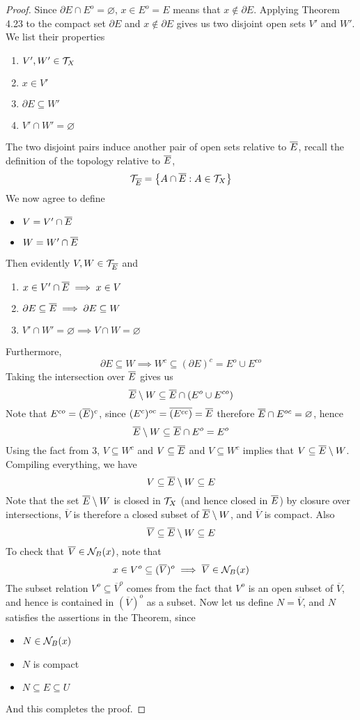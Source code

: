 \documentclass[../../main.tex]{subfiles}
\begin{document}
\begin{proof}
    Since $\partial E\cap E^o = \varnothing$, $x\in E^o=E$ means that $x\notin \partial E$. Applying Theorem 4.23 to the compact set $\partial E$ and $x\notin \partial E$ gives us two disjoint open sets $V'$ and $W'$. We list their properties
    \begin{enumerate}
        \item $V', W'\in\mathcal{T}_X$
        \item $x\in V'$
        \item $\partial E\subseteq W'$
        \item $V'\cap W' = \varnothing$
    \end{enumerate}
    The two disjoint pairs induce another pair of open sets relative to $\overline{E}$, recall the definition of the topology relative to $\overline{E}$,
    \[
    \mathcal{T}_{\overline{E}} = \left\{A\cap\overline{E}:A\in\mathcal{T}_X\right\}
    \]
    We now agree to define
    \begin{itemize}
        \item $V = V'\cap \overline{E}$
        \item $W = W'\cap \overline{E}$
    \end{itemize}
    Then evidently $V, W\in\mathcal{T}_{\overline{E}}$ and 
    \begin{enumerate}
        \item $x\in V'\cap\overline{E}\implies x\in V$
        \item $\partial E\subseteq \overline{E}\implies \partial E\subseteq W$
        \item $V'\cap W'=\varnothing\implies V\cap W=\varnothing$
    \end{enumerate}
    Furthermore,
    \[
    \partial E\subseteq W\implies W^c\subseteq (\partial E)^c = E^o\cup E^{co}
    \]
    Taking the intersection over $\overline{E}$ gives us
    \[
    \overline{E}\setminus W\subseteq \overline{E}\cap \left(E^o\cup E^{co}\right)
    \]
    Note that $E^{co} = (\overline{E})^c$, since $(E^c)^{oc} = \overline{(E^{cc})}=\overline{E}$ therefore $\overline{E}\cap E^{oc}=\varnothing$, hence
    \[
    \overline{E}\setminus W\subseteq \overline{E}\cap E^{o} = E^{o}
    \]
    Using the fact from 3, $V\subseteq W^c$ and $V\subseteq \overline{E}$ and $V\subseteq W^c$ implies that $V\subseteq\overline{E}\setminus W$. Compiling everything, we have
    \[
    V\subseteq \overline{E}\setminus W\subseteq E
    \]
    Note that the set $\overline{E}\setminus W$ is closed in $\mathcal{T}_X$ (and hence closed in $\overline{E}$) by closure over intersections, $\overline{V}$ is therefore a closed subset of $\overline{E}\setminus W$, and $\overline{V}$ is compact. Also
    \[
    \overline{V} \subseteq \overline{E}\setminus W\subseteq E
    \]
    To check that $\overline{V}\in\mathcal{N}_B({x})$, note that
    \[
    x\in V^o\subseteq (\overline{V})^o\implies \overline{V}\in\mathcal{N}_B({x})
    \]
    The subset relation $V^o\subseteq \overline{V}^o$ comes from the fact that $V^o$ is an open subset of $\overline{V}$, and hence is contained in $(\overline{V})^o$ as a subset. Now let us define $N=\overline{V}$, and $N$ satisfies the assertions in the Theorem, since
    \begin{itemize}
        \item $N\in\mathcal{N}_B({x})$
        \item $N$ is compact
        \item $N\subseteq E\subseteq U$
    \end{itemize}
    And this completes the proof.
\end{proof}
\end{document}
